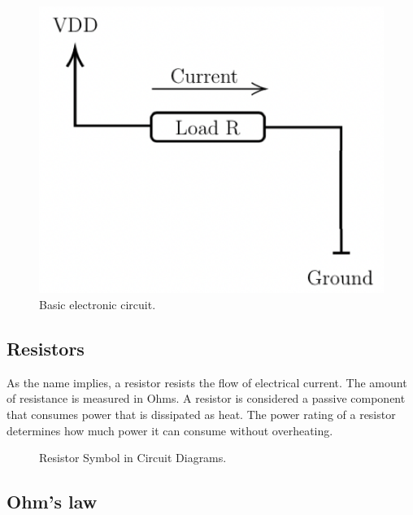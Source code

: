 \begin{figure}[!ht]
	\centering
	\includegraphics{images/basic_electronic_circuit.png}
	\caption{Basic electronic circuit.} \label{fig:basic_electronic_circuitn}
\end{figure}

\subsection{Resistors}

As the name implies, a resistor resists the flow of electrical current. The
amount of resistance is measured in Ohms. A resistor is considered a passive
component that consumes power that is dissipated as heat. The power rating of a
resistor determines how much power it can consume without overheating.

\begin{figure}[!ht]
    \centering
    
    \caption{Resistor Symbol in Circuit Diagrams.} \label{fig:resistor}
\end{figure}

\subsection{Ohm's law}

